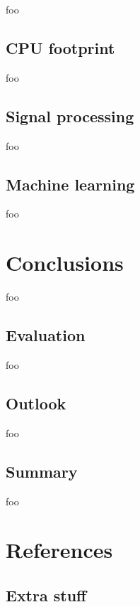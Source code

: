 \documentclass[letter,12pt]{article}
\begin{document}
foo

\subsection{CPU footprint}

foo

\subsection{Signal processing}

foo

\subsection{Machine learning}

foo

\section{Conclusions}

foo

\subsection{Evaluation}

foo

\subsection{Outlook}

foo

\subsection{Summary}

foo

\vfill
\clearpage %

\section{References}
\printbibliography[heading=none]

\vfill
\clearpage %

\begin{appendices}

\section{Extra stuff}
\label{appendix:rthpss}

\end{appendices}
\end{document}
